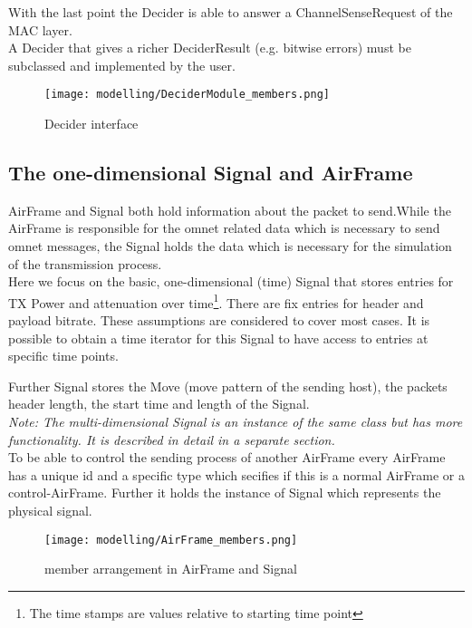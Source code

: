 With the last point the Decider is able to answer a ChannelSenseRequest of the
MAC layer.\\

A Decider that gives a richer DeciderResult (e.g. bitwise
errors) must be subclassed and implemented by the user.

\begin{figure}[H]
 \centering
 \texttt{[image: modelling/DeciderModule\_members.png]}
 \caption{Decider interface}
 \label{fig: Decider interface}
\end{figure}

\newpage

\subsection{The one-dimensional Signal and AirFrame}
\label{AirFrame and Signal}

AirFrame and Signal both hold information about the packet to send.While the
AirFrame is responsible for the omnet related data which is necessary to send
omnet messages, the Signal holds the data which is necessary for the simulation
of the transmission process.\\

Here we focus on the basic, one-dimensional (time) Signal that stores entries
for TX Power and attenuation over time\footnote{The time stamps are values
relative to starting time point}. There are fix entries for header and
payload bitrate. These assumptions are considered to cover most cases.
It is possible to obtain a time iterator for this Signal to have access to
entries at specific time points.

Further Signal stores the Move (move pattern of the sending host), the packets
header length, the start time and length of the Signal.\\

\emph{Note: The multi-dimensional Signal is an instance of the same class but
has more functionality. It is described in detail in a separate section.}\\

To be able to control the sending process of another AirFrame
every AirFrame has a unique id and a specific type which secifies if this is a
normal AirFrame or a control-AirFrame. Further it holds the instance of Signal
which represents the physical signal.


\begin{figure}[H]
 \centering
 \texttt{[image: modelling/AirFrame\_members.png]}
 \caption{member arrangement in AirFrame and Signal}
 \label{fig:memberAirFrame}
\end{figure}
\newpage

